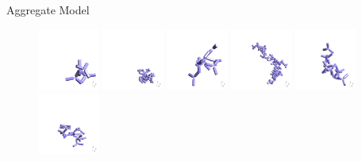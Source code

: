 \documentclass[12pt]{beamer}
\begin{document}
\begin{frame}{Aggregate Model}
\begin{figure}
    \includegraphics[width = 0.18\textwidth]{Figures/aggregates/aggregate3443.png}
    \hfill
    \includegraphics[width = 0.18\textwidth]{Figures/aggregates/aggregate4115.png}
    \includegraphics[width = 0.18\textwidth]{Figures/aggregates/aggregate4346.png}
    \includegraphics[width = 0.18\textwidth]{Figures/aggregates/aggregate4539.png}
    \includegraphics[width = 0.18\textwidth]{Figures/aggregates/aggregate5009.png}
    \includegraphics[width = 0.18\textwidth]{Figures/aggregates/aggregate5203.png}
\end{figure}
\end{frame}
\end{document}
